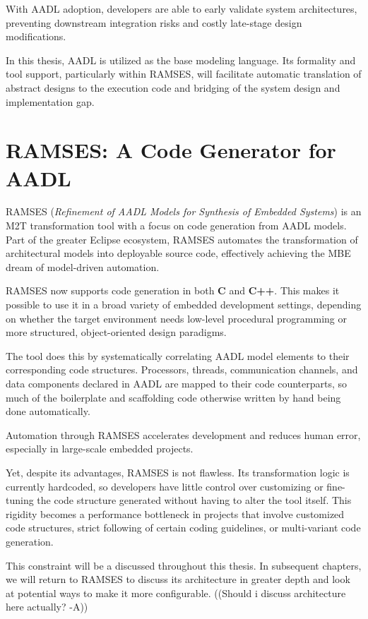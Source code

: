 \begin{tcolorbox}[colback=blue!5, colframe=blue!40!black] With AADL adoption, developers are able to early validate system architectures, preventing downstream integration risks and costly late-stage design modifications.  \end{tcolorbox}

\par
In this thesis, AADL is utilized as the base modeling language. Its formality and tool support, particularly within RAMSES, will facilitate automatic translation of abstract designs to the execution code and bridging of the system design and implementation gap.


\section{RAMSES: A Code Generator for AADL} \label{sec:ramses}

RAMSES (\textit{Refinement of AADL Models for Synthesis of Embedded Systems}) is an M2T transformation tool with a focus on code generation from AADL models. Part of the greater Eclipse ecosystem, RAMSES automates the transformation of architectural models into deployable source code, effectively achieving the MBE dream of model-driven automation.
\par 
RAMSES now supports code generation in both \textbf{C} and \textbf{C++}. This makes it possible to use it in a broad variety of embedded development settings, depending on whether the target environment needs low-level procedural programming or more structured, object-oriented design paradigms.
\par 
The tool does this by systematically correlating AADL model elements to their corresponding code structures. Processors, threads, communication channels, and data components declared in AADL are mapped to their code counterparts, so much of the boilerplate and scaffolding code otherwise written by hand being done automatically.

\begin{tcolorbox}[colback=green!5, colframe=green!40!black] Automation through RAMSES accelerates development and reduces human error, especially in large-scale embedded projects. \end{tcolorbox}

Yet, despite its advantages, RAMSES is not flawless. Its transformation logic is currently hardcoded, so developers have little control over customizing or fine-tuning the code structure generated without having to alter the tool itself. This rigidity becomes a performance bottleneck in projects that involve customized code structures, strict following of certain coding guidelines, or multi-variant code generation.
\par 
This constraint will be a discussed throughout this thesis. In subsequent chapters, we will return to RAMSES to discuss its architecture in greater depth and look at potential ways to make it more configurable. ((Should i discuss architecture here actually? -A))





